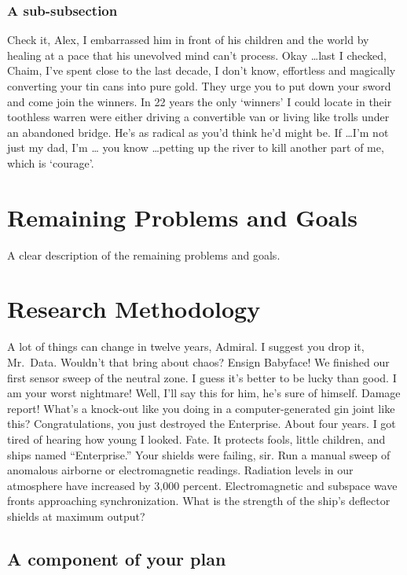 \subsubsection{A sub-subsection}
Check it, Alex, I embarrassed him in front of his children and the world by
healing at a pace that his unevolved mind can't process. Okay \ldots last I
checked, Chaim, I've spent close to the last decade, I don't know,
effortless and magically converting your tin cans into pure gold. They urge
you to put down your sword and come join the winners. In 22 years the only
`winners' I could locate in their toothless warren were either driving a
convertible van or living like trolls under an abandoned bridge.  He's as
radical as you'd think he'd might be. If \ldots I'm not just my dad, I'm \ldots
you know \ldots petting up the river to kill another part of me, which is
`courage'.

\section{Remaining Problems and Goals}
A clear description of the remaining problems and goals.

\section{Research Methodology}
A lot of things can change in twelve years, Admiral. I suggest you drop it, Mr.\ Data. Wouldn't that bring about chaos? Ensign Babyface! We finished our first sensor sweep of the neutral zone. I guess it's better to be lucky than good. I am your worst nightmare! Well, I'll say this for him, he's sure of himself. Damage report! What's a knock-out like you doing in a computer-generated gin joint like this? Congratulations, you just destroyed the Enterprise. About four years. I got tired of hearing how young I looked. Fate. It protects fools, little children, and ships named ``Enterprise.'' Your shields were failing, sir. Run a manual sweep of anomalous airborne or electromagnetic readings. Radiation levels in our atmosphere have increased by 3,000 percent. Electromagnetic and subspace wave fronts approaching synchronization. What is the strength of the ship's deflector shields at maximum output?

\subsection{A component of your plan}

